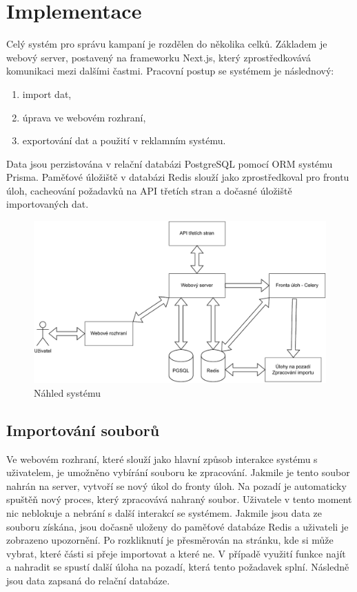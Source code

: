 \chapter{Implementace}
\label{chap:implementation}
Celý systém pro správu kampaní je rozdělen do několika celků. Základem je webový server, postavený na frameworku Next.js, který zprostředkovává komunikaci mezi dalšími častmi.
Pracovní postup se systémem je následnový:
\begin{enumerate}
    \item import dat,
    \item úprava ve webovém rozhraní,
    \item exportování dat a použití v reklamním systému.
\end{enumerate}
Data jsou perzistována v relační databázi PostgreSQL pomocí ORM systému Prisma.
Paměťové úložiště v databázi Redis slouží jako zprostředkoval pro frontu úloh, cacheování požadavků na API třetích stran a dočasné úložiště importovaných dat.

\begin{figure}[h]
    \centering
    \includegraphics[width=1\textwidth]{Figures/system-overview.pdf}
    \caption{Náhled systému}
    \label{fig:system-overview}
\end{figure}

\section{Importování souborů}
Ve webovém rozhraní, které slouží jako hlavní způsob interakce systému s uživatelem, je umožněno vybírání souboru ke zpracování.
Jakmile je tento soubor nahrán na server, vytvoří se nový úkol do fronty úloh. Na pozadí je automaticky spuštěň nový proces, který
zpracovává nahraný soubor. Uživatele v tento moment nic neblokuje a nebrání s další interakcí se systémem. Jakmile jsou data ze souboru
získána, jsou dočasně uloženy do paměťové databáze Redis a uživateli je zobrazeno upozornění.
Po rozkliknutí je přesměrován na stránku, kde si může vybrat, které části si přeje importovat a které ne.
V případě využití funkce najít a nahradit se spustí další úloha na pozadí, která tento požadavek splní.
Následně jsou data zapsaná do relační databáze.

